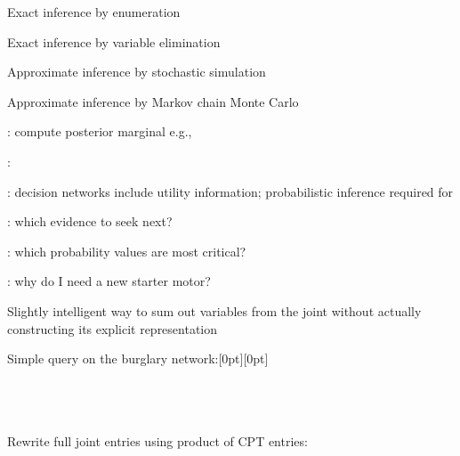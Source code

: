 \documentclass{article}
\begin{document}
\begin{huge}

\sf


\blob Exact inference by enumeration

\blob Exact inference by variable elimination

\blob Approximate inference by stochastic simulation

\blob Approximate inference by Markov chain Monte Carlo



: compute posterior marginal \al
  e.g., 

: 

: decision networks include utility information;\nl
    probabilistic inference required for 

: which evidence to seek next?

: which probability values are most critical?

: why do I need a new starter motor?




Slightly intelligent way to sum out variables from the joint
without actually constructing its explicit representation

Simple query on the burglary network:\hspace*{2.5in}\epsfxsize=1.5in\raisebox{-1.5in}[0pt][0pt]{}\\
\\
\\
\\

Rewrite full joint entries using product of CPT entries:\\
\\
\\
       

\end{huge}
\end{document}
